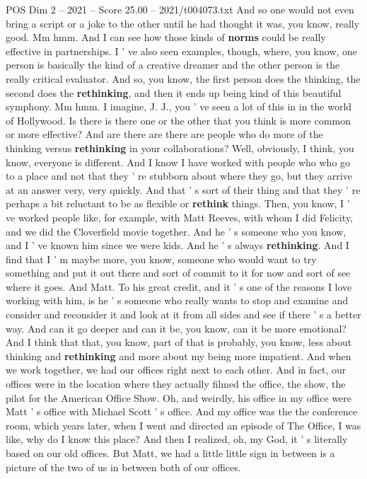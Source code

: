 \begin{textsample}{POS Dim 2 – 2021 – Score 25.00 – 2021/t004073.txt}
And so one would not even bring a script or a joke to the other until he had thought it was, you know, really good.
Mm hmm.
And I can see how those kinds of \textbf{norms} could be really effective in partnerships.
I ' ve also seen examples, though, where, you know, one person is basically the kind of a creative dreamer and the other person is the really critical evaluator.
And so, you know, the first person does the thinking, the second does the \textbf{rethinking}, and then it ends up being kind of this beautiful symphony.
Mm hmm.
I imagine, J.
J., you ' ve seen a lot of this in in the world of Hollywood.
Is there is there one or the other that you think is more common or more effective?
And are there are there are people who do more of the thinking versus \textbf{rethinking} in your collaborations?
Well, obviously, I think, you know, everyone is different.
And I know I have worked with people who who go to a place and not that they ' re stubborn about where they go, but they arrive at an answer very, very quickly.
And that ' s sort of their thing and that they ' re perhaps a bit reluctant to be as flexible or \textbf{rethink} things.
Then, you know, I ' ve worked people like, for example, with Matt Reeves, with whom I did Felicity, and we did the Cloverfield movie together.
And he ' s someone who you know, and I ' ve known him since we were kids.
And he ' s always \textbf{rethinking}.
And I find that I ' m maybe more, you know, someone who would want to try something and put it out there and sort of commit to it for now and sort of see where it goes.
And Matt.
To his great credit, and it ' s one of the reasons I love working with him, is he ' s someone who really wants to stop and examine and consider and reconsider it and look at it from all sides and see if there ' s a better way.
And can it go deeper and can it be, you know, can it be more emotional?
And I think that that, you know, part of that is probably, you know, less about thinking and \textbf{rethinking} and more about my being more impatient.
And when we work together, we had our offices right next to each other.
And in fact, our offices were in the location where they actually filmed the office, the show, the pilot for the American Office Show.
Oh, and weirdly, his office in my office were Matt ' s office with Michael Scott ' s office.
And my office was the the conference room, which years later, when I went and directed an episode of The Office, I was like, why do I know this place?
And then I realized, oh, my God, it ' s literally based on our old offices.
But Matt, we had a little little sign in between is a picture of the two of us in between both of our offices.

\end{textsample}
